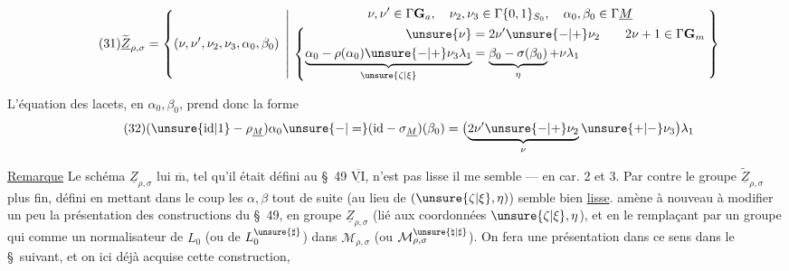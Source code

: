 

\[
\tag{31}
\widetilde{\underline Z}_{\rho,\sigma}
=\left\{(\nu,\nu',\nu_2,\nu_3,\alpha_0,\beta_0)\ \left|\
\begin{gathered}
\nu,\nu'\in\Gamma\mathbf G_a,\quad
\nu_2,\nu_3\in\Gamma\{0,1\}_{S_0},\quad
\alpha_0,\beta_0\in\Gamma\underline M\\
\left\{\begin{aligned}
\unsure{\nu}&=2\nu'\unsure{-|+}\nu_2\qquad 2\nu+1\in\Gamma\mathbf G_m\\
\underbrace{\alpha_0-\rho(\alpha_0)\unsure{-|+}\nu_3\lambda_1}_{\unsure{\zeta|\xi}}
&=\underbrace{\beta_0-\sigma(\beta_0)}_{\eta}+\nu\lambda_1
\end{aligned}\right.
\end{gathered}\right.\right\}
\]

L'équation des lacets, en $\alpha_0,\beta_0$, prend donc
la forme
\[
\tag{32}
(\unsure{\mathrm{id}|1}-\rho_{\underline M})\alpha_0
\unsure{-|=}(\mathrm{id}-\sigma_{\underline M})(\beta_0)
=\bigl(\underbrace{2\nu'\unsure{-|+}\nu_2}_{\nu}\unsure{+|-}\nu_3\bigr)\lambda_1
\]


\uline{Remarque} Le schéma $\underline Z_{\rho,\sigma}$ lui $\overline{\mathrm m}$, tel qu'il
était défini au \S\ 49 \deleted{\unsure{\S\ 6}} $\overline{\underline{\mathrm{VI}}}$, n'est pas lisse
il me semble --- \unsure{ça coince|se corse} en car. 2 et 3.
Par contre le groupe $\widetilde{\underline Z}_{\rho,\sigma}$ plus fin,
défini en mettant dans le coup les
$\alpha,\beta$ tout de suite (au lieu de $(\unsure{\zeta|\xi},\eta)$)
semble bien \uline{lisse}. \unsure{Ça} amène à nouveau
à modifier un peu la présentation des
constructions du \S\ 49, en 
 groupe $\underline Z_{\rho,\sigma}$ (lié aux coordonnées
$\unsure{\zeta|\xi},\eta$), et en le remplaçant par
un groupe qui   comme un
normalisateur de $L_0$ (ou de $L_0^{\unsure{\sharp}}$) dans $\mathcal M_{\rho,\sigma}$
(ou $\mathcal M_{\rho,\sigma}^{\unsure{\natural|\sharp}}$). On fera une présentation dans
ce sens dans le \deleted{\unsure{suite}} \S\ suivant, et on
 ici déjà acquise cette construction,



